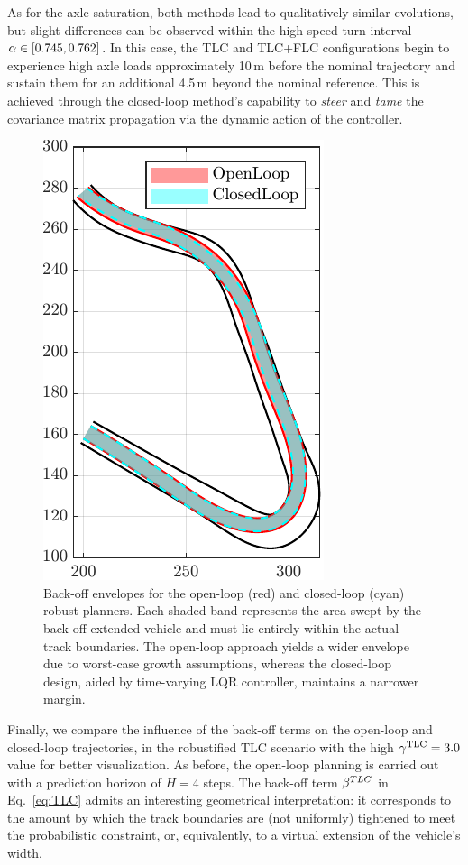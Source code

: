 As for the axle saturation, both methods lead to qualitatively similar evolutions, but slight differences can be observed within the high-speed turn interval $\alpha \in [0.745, 0.762]$. In this case, the TLC and TLC+FLC configurations begin to experience high axle loads approximately 10\,m before the nominal trajectory and sustain them for an additional 4.5\,m beyond the nominal reference. This is achieved through the closed-loop method's capability to \emph{steer} and \emph{tame} the covariance matrix propagation via the dynamic action of the controller.

\begin{figure}[b!]
	\centering
	\includegraphics{Fig/olcl_traj_bands.pdf}
	\caption{Back-off envelopes for the open-loop (red) and closed-loop (cyan) robust planners. Each shaded band represents the area swept by the back-off-extended vehicle and must lie entirely within the actual track boundaries.
		The open-loop approach yields a wider envelope due to worst-case growth assumptions, whereas the closed-loop design, aided by time-varying LQR controller, maintains a narrower margin.}
	\label{fig:olcl_traj_bands}
\end{figure}
Finally, we compare the influence of the back-off terms on the open-loop and closed-loop trajectories, in the robustified TLC scenario with the high $\gamma^\textrm{TLC}=3.0$ value for better visualization. As before, the open-loop planning is carried out with a prediction horizon of $H=4$ steps.
The back-off term $\beta^{TLC}$ in Eq.~\eqref{eq:TLC} admits an interesting geometrical interpretation: it corresponds to the amount by which the track boundaries are (not uniformly) tightened to meet the probabilistic constraint, or, equivalently, to a virtual extension of the vehicle's width.

